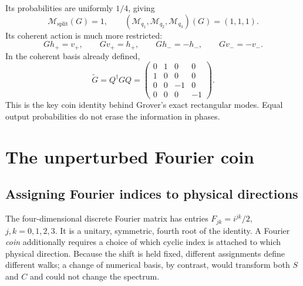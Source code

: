 \documentclass[11pt,a4paper,oneside]{report}
\numberwithin{equation}{chapter}
\begin{document}
Its probabilities are uniformly \(1/4\), giving
\begin{equation}
\mathcal M_{\mathrm{split}}(G)=1,\qquad
(\mathcal M_{q_1},\mathcal M_{q_2},\mathcal M_{q_3})(G)=(1,1,1).
\end{equation}
Its coherent action is much more restricted:
\begin{equation}
G h_+=v_+,\qquad Gv_+=h_+,\qquad
Gh_-=-h_-,\qquad Gv_-=-v_-.
\end{equation}
In the coherent basis already defined,
\begin{equation}
\widetilde G=Q^\dagger GQ=
\begin{pmatrix}
0&1&0&0\\1&0&0&0\\0&0&-1&0\\0&0&0&-1
\end{pmatrix}.
\end{equation}
This is the key coin identity behind Grover's exact rectangular modes.
Equal output probabilities do not erase the information in phases.

\section{The unperturbed Fourier coin}
\label{sec:fouriercoin}

\subsection{Assigning Fourier indices to physical directions}

The four-dimensional discrete Fourier matrix has entries
\(F_{jk}=i^{jk}/2\), \(j,k=0,1,2,3\). It is a unitary, symmetric,
fourth root of the identity. A Fourier \emph{coin} additionally requires a
choice of which cyclic index is attached to which physical direction.
Because the shift is held fixed, different assignments define different
walks; a change of numerical basis, by contrast, would transform both
\(S\) and \(C\) and could not change the spectrum.
\end{document}
